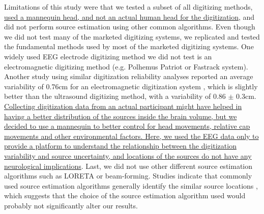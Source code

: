 \documentclass[../thesis_seyed.tex]{subfiles}
\begin{document}
Limitations of this study were that we tested a subset of all digitizing methods, \ul{used a mannequin head, and not an actual human head for the digitization}, and did not perform source estimation using other common algorithms. Even though we did not test many of the marketed digitizing systems, we replicated and tested the fundamental methods used by most of the marketed digitizing systems. One widely used EEG electrode digitizing method we did not test is an electromagnetic digitizing method (e.g. Polhemus Patriot or Fastrack system). Another study using similar digitization reliability analyses reported an average variability of 0.76cm for an electromagnetic digitization system \cite{Clausner2017-hv}, which is slightly better than the ultrasound digitizing method, with a variability of 0.86 $\pm$ 0.3cm. \ul{Collecting digitization data from an actual participant might have helped in having a better distribution of the sources inside the brain volume, but we decided to use a mannequin to better control for head movements, relative cap movements and other environmental factors. Here, we used the EEG data only to provide a platform to understand the relationship between the digitization variability and source uncertainty, and locations of the sources do not have any neurological implications}. Last, we did not use other different source estimation algorithms such as LORETA or beam-forming. Studies indicate that commonly used source estimation algorithms generally identify the similar source locations \cite{Mahjoory2017-jv,Bradley2016-sk,Song2015-fv}, which suggests that the choice of the source estimation algorithm used would probably not significantly alter our results. 

    
\end{document}
